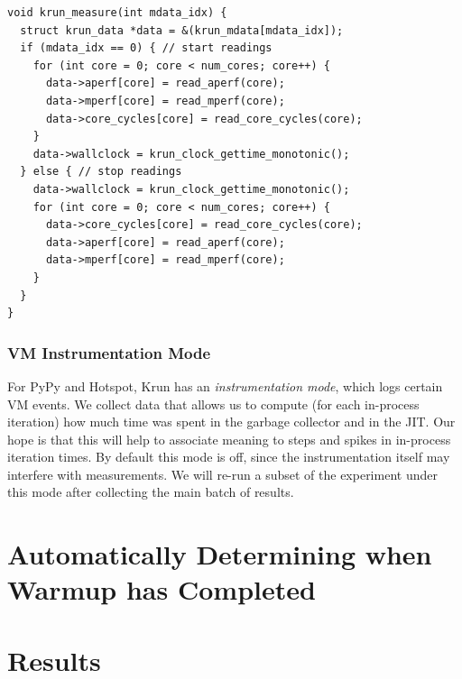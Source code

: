 \documentclass[preprint,numbers,10pt]{sigplanconf}
\newcommand{\krun}{Krun\xspace}
\begin{document}
\begin{lstlisting}[label=lst:krun-measure, xleftmargin=0cm,
        caption={%
\texttt{krun\_measure}: We cannot easily collect the measurements atomically,
so we take the most important reading, wall-clock time, innermost. The
\texttt{aperf} and \texttt{mperf} readings will be used to compute a ratio, and
must be collected in the same order both before and after.}]
void krun_measure(int mdata_idx) {
  struct krun_data *data = &(krun_mdata[mdata_idx]);
  if (mdata_idx == 0) { // start readings
    for (int core = 0; core < num_cores; core++) {
      data->aperf[core] = read_aperf(core);
      data->mperf[core] = read_mperf(core);
      data->core_cycles[core] = read_core_cycles(core);
    }
    data->wallclock = krun_clock_gettime_monotonic();
  } else { // stop readings
    data->wallclock = krun_clock_gettime_monotonic();
    for (int core = 0; core < num_cores; core++) {
      data->core_cycles[core] = read_core_cycles(core);
      data->aperf[core] = read_aperf(core);
      data->mperf[core] = read_mperf(core);
    }
  }
}
\end{lstlisting}

\subsubsection{VM Instrumentation Mode}

For PyPy and Hotspot, \krun has an \emph{instrumentation mode}, which logs certain
VM events. We collect data that allows us to compute (for each in-process
iteration) how much time was spent in the garbage collector and in the JIT.
Our hope is that this will help to associate meaning to
steps and spikes in in-process iteration times. By default this mode is off,
since the instrumentation itself may interfere with measurements.
We will re-run a subset of the experiment under this mode after collecting the
main batch of results.


\section{Automatically Determining when Warmup has Completed}
\label{sec:stats}


\section{Results}
\label{sec:Results}

%
\end{document}
